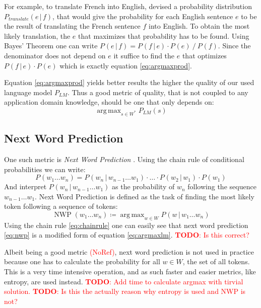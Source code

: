 \documentclass[11pt,a4paper]{article}
\newcommand\givenbase[1][]{\,#1\lvert\,}
\let\given\givenbase
\DeclareMathOperator*{\argmax}{arg\,max}
\newcommand{\probSymbol}[1][]{P_{#1}}
\newcommand{\prob}[2][]{\probSymbol[#1](#2)}
\newcommand{\probCond}[3][]{\prob[#1]{#2 \given #3}}
\newcommand{\nwp}[1]{\operatorname{NWP}(#1)}
\newcommand{\todo}[1]{\textcolor{red}{\textbf{TODO}: #1}}
\newcommand{\noref}{\textcolor{red}{(NoRef)}}
\begin{document}
For example, to translate French into English, \cite{Brown1990} devised a
probability distribution $\probCond[translate]{e}{f}$, that would give the
probability for each English sentence $e$ to be the result of translating
the French sentence $f$ into English.
To obtain the most likely translation, the $e$ that maximizes that probability
has to be found.
Using Bayes' Theorem one can write
$\probCond{e}{f} = {\probCond{f}{e}\cdot\prob{e} \mathbin{/} \prob{f}}$.
Since the denominator does not depend on $e$ it suffice to find the $e$ that
optimizes ${\probCond{f}{e} \cdot \prob{e}}$ which is exactly equation
\eqref{eq:argmaxprod}.

Equation \eqref{eq:argmaxprod} yields better results the higher the quality of our
used language model $\probSymbol[LM]$.
Thus a good metric of quality, that is not coupled to any application domain
knowledge, should be one that only depends on:
\begin{equation}\label{eq:argmaxlm}
  \argmax_{s \in W^*} \prob[LM]{s}
\end{equation}

\subsection{Next Word Prediction}

One such metric is \emph{Next Word Prediction} \parencite{Shannon1951}.
Using the chain rule of conditional probabilities we can write:
\begin{equation}\label{eq:chainrule}
  \prob{w_1 \ldots w_n} = \probCond{w_n}{w_{n-1} \ldots w_1} \cdot \ldots
                          \cdot \probCond{w_2}{w_1} \cdot \prob{w_1}
\end{equation}
And interpret $\probCond{w_n}{w_{n-1} \dots w_1}$ as the probability of $w_n$
following the sequence $w_{n-1} \ldots w_1$. Next Word Prediction is defined as
the task of finding the most likely token following a sequence of tokens:
\begin{equation}\label{eq:nwp}
  \nwp{w_1 \dots w_n} \coloneqq \argmax_{w \in W} \probCond{w}{w_1 \ldots w_n}
\end{equation}
Using the chain rule \eqref{eq:chainrule} one can easily see that next word
prediction \eqref{eq:nwp} is a modified form of equation \eqref{eq:argmaxlm}.
\todo{Is this correct?}

Albeit being a good metric \noref, next word prediction is not used in practice
because one has to calculate the probability for all $w \in W$, the set of all
tokens.
This is a very time intensive operation, and as such faster and easier metrics,
like entropy, are used instead.
\todo{Add time to calculate argmax with tirvial solution.}
\todo{Is this the actually reason why entropy is used and NWP is not?}
\end{document}
